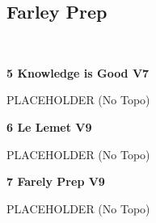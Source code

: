 \begin{multicols*}{2}
			\subsection*{Farley Prep}\label{bf:Farley Prep}
			\begin{minipage}{\columnwidth}
			\
			\end{minipage}
			
					\label{rt:Knowledge is Good}\colorbox{Goldenrod!50}{\textbf{5 Knowledge is Good V7  }}
					\begin{adjustwidth}{0.5cm}{}
					\begin{minipage}{\linewidth}					
					PLACEHOLDER
						\newline (No Topo) 
					\end{minipage}
					\end{adjustwidth}
					\label{rt:Le Lemet}\colorbox{Goldenrod!50}{\textbf{6 Le Lemet V9  }}
					\begin{adjustwidth}{0.5cm}{}
					\begin{minipage}{\linewidth}					
					PLACEHOLDER
						\newline (No Topo) 
					\end{minipage}
					\end{adjustwidth}
					\label{rt:Farely Prep}\colorbox{Goldenrod!50}{\textbf{7 Farely Prep V9  }}
					\begin{adjustwidth}{0.5cm}{}
					\begin{minipage}{\linewidth}					
					PLACEHOLDER
						\newline (No Topo) 
					\end{minipage}
					\end{adjustwidth}
\end{multicols*}
\clearpage
